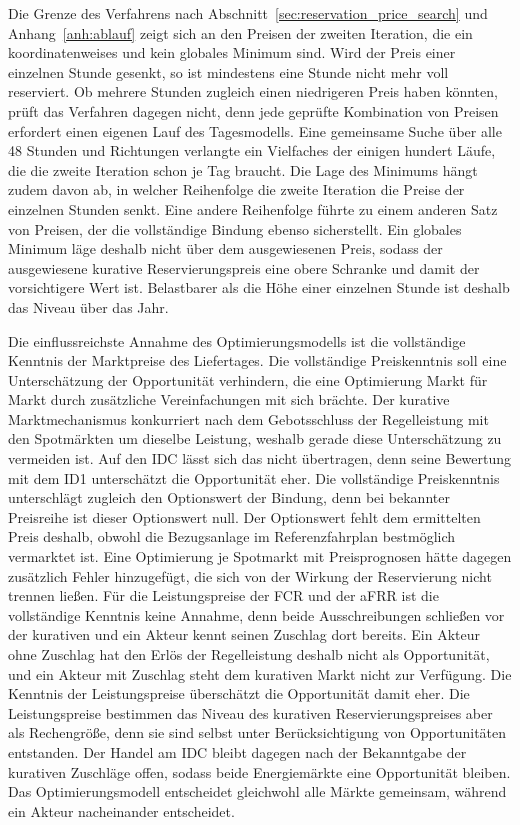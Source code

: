Die Grenze des Verfahrens nach Abschnitt~\ref{sec:reservation_price_search} und Anhang~\ref{anh:ablauf} zeigt sich an den Preisen der zweiten Iteration, die ein koordinatenweises und kein globales Minimum sind.
Wird der Preis einer einzelnen Stunde gesenkt, so ist mindestens eine Stunde nicht mehr voll reserviert.
Ob mehrere Stunden zugleich einen niedrigeren Preis haben könnten, prüft das Verfahren dagegen nicht, denn jede geprüfte Kombination von Preisen erfordert einen eigenen Lauf des Tagesmodells.
Eine gemeinsame Suche über alle 48 Stunden und Richtungen verlangte ein Vielfaches der einigen hundert Läufe, die die zweite Iteration schon je Tag braucht.
Die Lage des Minimums hängt zudem davon ab, in welcher Reihenfolge die zweite Iteration die Preise der einzelnen Stunden senkt.
Eine andere Reihenfolge führte zu einem anderen Satz von Preisen, der die vollständige Bindung ebenso sicherstellt.
Ein globales Minimum läge deshalb nicht über dem ausgewiesenen Preis, sodass der ausgewiesene kurative Reservierungspreis eine obere Schranke und damit der vorsichtigere Wert ist.
Belastbarer als die Höhe einer einzelnen Stunde ist deshalb das Niveau über das Jahr.

Die einflussreichste Annahme des Optimierungsmodells ist die vollständige Kenntnis der Marktpreise des Liefertages.
Die vollständige Preiskenntnis soll eine Unterschätzung der Opportunität verhindern, die eine Optimierung Markt für Markt durch zusätzliche Vereinfachungen mit sich brächte.
Der kurative Marktmechanismus konkurriert nach dem Gebotsschluss der Regelleistung mit den Spotmärkten um dieselbe Leistung, weshalb gerade diese Unterschätzung zu vermeiden ist.
Auf den \ac{IDC} lässt sich das nicht übertragen, denn seine Bewertung mit dem \ac{ID1} unterschätzt die Opportunität eher.
Die vollständige Preiskenntnis unterschlägt zugleich den Optionswert der Bindung, denn bei bekannter Preisreihe ist dieser Optionswert null.
Der Optionswert fehlt dem ermittelten Preis deshalb, obwohl die Bezugsanlage im Referenzfahrplan bestmöglich vermarktet ist.
Eine Optimierung je Spotmarkt mit Preisprognosen hätte dagegen zusätzlich Fehler hinzugefügt, die sich von der Wirkung der Reservierung nicht trennen ließen.
Für die Leistungspreise der \ac{FCR} und der \ac{aFRR} ist die vollständige Kenntnis keine Annahme, denn beide Ausschreibungen schließen vor der kurativen und ein Akteur kennt seinen Zuschlag dort bereits.
Ein Akteur ohne Zuschlag hat den Erlös der Regelleistung deshalb nicht als Opportunität, und ein Akteur mit Zuschlag steht dem kurativen Markt nicht zur Verfügung.
Die Kenntnis der Leistungspreise überschätzt die Opportunität damit eher.
Die Leistungspreise bestimmen das Niveau des kurativen Reservierungspreises aber als Rechengröße, denn sie sind selbst unter Berücksichtigung von Opportunitäten entstanden.
Der Handel am \ac{IDC} bleibt dagegen nach der Bekanntgabe der kurativen Zuschläge offen, sodass beide Energiemärkte eine Opportunität bleiben.
Das Optimierungsmodell entscheidet gleichwohl alle Märkte gemeinsam, während ein Akteur nacheinander entscheidet.

